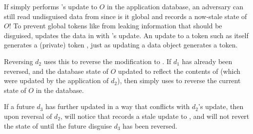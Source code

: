 If \sys simply performs 's update to $O$ in the application database, an adversary can still
read undisguised data from  since is it global and records a now-stale state of $O$!
%
%
To prevent global tokens like  from leaking information that should be disguised, \sys
updates the data in  with 's update. An update to a token such as 
itself generates a (private) token , just as updating a data object generates a token.

Reversing $d_2$ uses this  to reverse the modification to . 
If $d_1$ has already been reversed, and the database state of $O$ updated to reflect the contents
of  (which were updated by the application of $d_2$), 
then \sys simply uses  to reverse the current state of $O$ in the database. 

If a future $d_3$ has further updated  in a way that conflicts with $d_2$'s update,
then upon reversal of $d_2$, \sys will notice that  records a stale update to , 
and will not revert
the state of  until the future disguise $d_3$ has been reversed.




